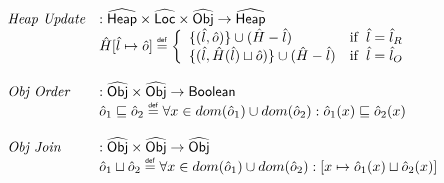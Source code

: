 \documentclass{article}
\newcommand{\SF}[1]{\mbox{\textsf{#1}}}
\newcommand{\ifc}[1]{{\rm if}\begin{array}[t]{l}#1\end{array}}
\newcommand{\abs}[1]{\widehat{\SF{#1}}}
\newcommand{\aHeap}{\abs{Heap}}
\newcommand{\aLoc}{\abs{Loc}}
\newcommand{\aObj}{\abs{Obj}}
\newcommand{\defi}{\stackrel{\tiny \SF{def}}{=}}
\begin{document}
\[\begin{array}{ll}
\textit{Heap Update} & : \aHeap \times \aLoc \times \aObj \rightarrow \aHeap \\
& \hat{H}[\hat{l} \mapsto \hat{o}] \defi
 \left\{
   \begin{array}{ll}
      \{( \hat{l}, \hat{o})\} \cup (\hat{H}-\hat{l})
      & \ifc{\hat{l} = \hat{l}_R} \\
      \{( \hat{l}, \hat{H}(\hat{l}) \sqcup \hat{o})\} \cup (\hat{H}-\hat{l})
     & \ifc{\hat{l} = \hat{l}_O} \\
   \end{array}
 \right.\\
\\
\textit{Obj Order} & : \aObj \times \aObj \rightarrow \SF{Boolean} \\
& \hat{o}_1 \sqsubseteq \hat{o}_2 \defi \forall x \in dom(\hat{o}_1) \cup dom(\hat{o}_2): \hat{o}_1(x) \sqsubseteq \hat{o}_2(x)\\
\\
\textit{Obj Join} & : \aObj \times \aObj \rightarrow \aObj \\
& \hat{o}_1 \sqcup \hat{o}_2  \defi \forall x \in dom(\hat{o}_1) \cup dom(\hat{o}_2): \left[x \mapsto \hat{o}_1(x) \sqcup \hat{o}_2(x)\right]\\
\\


\end{array}\]
\end{document}
